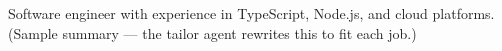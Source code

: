 Software engineer with experience in TypeScript, Node.js, and cloud platforms. (Sample summary — the tailor agent rewrites this to fit each job.)

